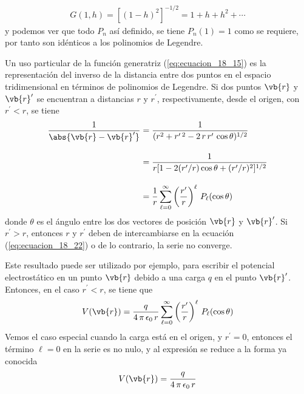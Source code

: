 \begin{align*}
G(1,h) = [(1 - h)^{2}]^{-1/2} =  1 + h + h^{2} + \cdots
\end{align*}
y podemos ver que todo $P_{n}$ así definido, se tiene $P_{n} (1) = 1$ como se requiere, por tanto son idénticos a los polinomios de Legendre.
\par
Un uso particular de la función generatriz (\ref{eq:ecuacion_18_15}) es la representación del inverso de la distancia entre dos puntos en el espacio tridimensional en términos de polinomios de Legendre. Si dos puntos $\vb{r}$ y $\vb{r}^{\prime}$ se encuentran a distancias $r$ y $r^{\prime}$, respectivamente, desde el origen, con $r^{\prime} < r$, se tiene
\begin{align}
\dfrac{1}{\abs{\vb{r} - \vb{r}^{\prime}}} &= \dfrac{1}{(r^{2} + r^{\prime \: 2} - 2 \, r \, r^{\prime} \, \cos \theta)^{1/2}} \nonumber \\[1em]
&= \dfrac{1}{r [ 1 - 2 (r^{\prime}/r) \cos \theta + (r^{\prime}/r)^{2}]^{1/2}} \nonumber \\[1em]
&= \dfrac{1}{r} \sum_{\ell = 0}^{\infty} \left( \dfrac{r^{\prime}}{r} \right)^{\ell} \, P_{\ell} (\cos \theta)
\label{eq:ecuacion_18_22}
\end{align}
donde $\theta$ es el ángulo entre los dos vectores de posición $\vb{r}$ y $\vb{r}^{\prime}$. Si $r^{\prime} > r$, entonces $r$ y $r^{\prime}$ deben de intercambiarse en la ecuación (\ref{eq:ecuacion_18_22}) o de lo contrario, la serie no converge.
\par
Este resultado puede ser utilizado por ejemplo, para escribir el potencial electrostático en un punto $\vb{r}$ debido a una carga $q$ en el punto $\vb{r}^{\prime}$. Entonces, en el caso $r^{\prime} < r$, se tiene que
\begin{align*}
V(\vb{r}) =  \dfrac{q}{4 \, \pi \, \epsilon_{0} \, r} \sum_{\ell = 0}^{\infty} \left( \dfrac{r^{\prime}}{r} \right)^{\ell} \, P_{\ell} (\cos \theta)
\end{align*}
Vemos el caso especial cuando la carga está en el origen, y $r^{\prime} =0$, entonces el término $\ell =0$ en la serie es no nulo, y al expresión se reduce a la forma ya conocida 
\begin{align*}
V(\vb{r}) = \frac{q}{4 \, \pi \, \epsilon_{0} \, r}
\end{align*}
